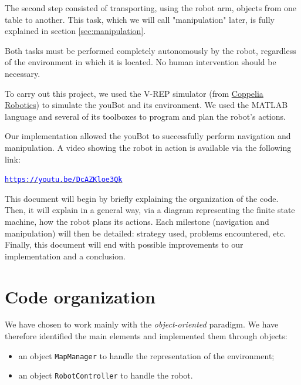 \documentclass[a4paper, 10pt, conference]{ieeeconf}
\begin{document}
    The second step consisted of transporting, using the robot arm, objects from one table to another. This task, which we will call "manipulation" later, is fully explained in section \ref{sec:manipulation}.
    
    Both tasks must be performed completely autonomously by the robot, regardless of the environment in which it is located. No human intervention should be necessary.
    
    To carry out this project, we used the V-REP simulator (from \href{https://www.coppeliarobotics.com}{Coppelia Robotics}) to simulate the youBot and its environment. We used the MATLAB language and several of its toolboxes to program and plan the robot's actions.
    
    Our implementation allowed the youBot to successfully perform navigation and manipulation. A video showing the robot in action is available via the following link:
    
    \begin{center}
        \href{https://youtu.be/DcAZKloe3Qk}{\texttt{\textcolor{blue}{https://youtu.be/DcAZKloe3Qk}}}
    \end{center}
    
    This document will begin by briefly explaining the organization of the code. Then, it will explain in a general way, via a diagram representing the finite state machine, how the robot plans its actions. Each milestone (navigation and manipulation) will then be detailed: strategy used, problems encountered, etc. Finally, this document will end with possible improvements to our implementation and a conclusion.
    
    
    \section{Code organization}
    
    We have chosen to work mainly with the \emph{object-oriented} paradigm. We have therefore identified the main elements and implemented them through objects:
    
    \begin{itemize}
        \item an object \texttt{MapManager} to handle the representation of the environment;
        \item an object \texttt{RobotController} to handle the robot.
    \end{itemize}
    
\end{document}
